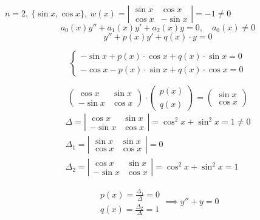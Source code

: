 \begin{example}
    $n = 2, \ \{\sin x, \cos x\}, \ w(x) = \left|\begin{array}{cc}
            \sin x & \cos x   \\
            \cos x & - \sin x
        \end{array}\right| = -1 \ne 0$
    \[
        a_0(x)y'' + a_1(x)y' + a_2(x)y = 0, \quad a_0(x) \ne 0
    \]
    \[
        y'' + p(x)y' + q(x) \cdot y = 0
    \]

    \[
        \left\{\begin{array}{l}
            -\sin x + p(x) \cdot \cos x + q(x)\cdot \sin x = 0 \\
            -\cos x - p(x) \cdot \sin x + q(x)\cdot \cos x = 0
        \end{array}\right.
    \]

    \[
        \begin{pmatrix}
            \cos x & \sin x \\ -\sin x & \cos x
        \end{pmatrix} \cdot \begin{pmatrix}
            p(x) \\ q(x)
        \end{pmatrix} = \begin{pmatrix}
            \sin x \\ \cos x
        \end{pmatrix}
    \]
    \[
        \begin{array}{l}
            \Delta = \left|\begin{array}{cc}
                               \cos x & \sin x \\ -\sin x & \cos x
                           \end{array}\right| = \cos^2 x + \sin^2 x = 1 \ne 0 \\
            \Delta_1 = \left|\begin{array}{cc}
                                 \sin x & \sin x \\ \cos x & \cos x
                             \end{array}\right| = 0                \\
            \Delta_2 = \left|\begin{array}{cc}
                                 \cos x & \sin x \\ -\sin x & \cos x
                             \end{array}\right| = \cos^2 x + \sin^2x = 1
        \end{array}
    \]

    \[
        \begin{array}{l}
            p(x) = \frac{\Delta_1}{\Delta} = 0 \\
            q(x) = \frac{\Delta_2}{\Delta} = 1
        \end{array} \implies y'' + y = 0
    \]
\end{example}

